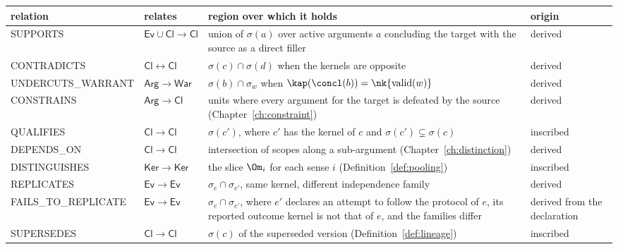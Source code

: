 \begin{center}
\small
\begin{tabularx}{\textwidth}{@{}l l X l@{}}
\toprule
relation & relates & region over which it holds & origin\\
\midrule
\textsf{SUPPORTS} & $\mathsf{Ev}\cup\mathsf{Cl}\to\mathsf{Cl}$ & union of $\sigma(a)$ over active arguments $a$ concluding the target with the source as a direct filler & derived\\
\textsf{CONTRADICTS} & $\mathsf{Cl}\leftrightarrow\mathsf{Cl}$ & $\sigma(c)\cap\sigma(d)$ when the kernels are opposite & derived\\
\textsf{UNDERCUTS\_WARRANT} & $\mathsf{Arg}\to\mathsf{War}$ & $\sigma(b)\cap\sigma_w$ when $\kap(\concl(b))=\nk{\mathrm{valid}(w)}$ & derived\\
\textsf{CONSTRAINS} & $\mathsf{Arg}\to\mathsf{Cl}$ & units where every argument for the target is defeated by the source (Chapter~\ref{ch:constraint}) & derived\\
\textsf{QUALIFIES} & $\mathsf{Cl}\to\mathsf{Cl}$ & $\sigma(c')$, where $c'$ has the kernel of $c$ and $\sigma(c')\subsetneq\sigma(c)$ & inscribed\\
\textsf{DEPENDS\_ON} & $\mathsf{Cl}\to\mathsf{Cl}$ & intersection of scopes along a sub-argument (Chapter~\ref{ch:distinction}) & derived\\
\textsf{DISTINGUISHES} & $\mathsf{Ker}\to\mathsf{Ker}$ & the slice $\Om_i$ for each sense $i$ (Definition~\ref{def:pooling}) & inscribed\\
\textsf{REPLICATES} & $\mathsf{Ev}\to\mathsf{Ev}$ & $\sigma_e\cap\sigma_{e'}$, same kernel, different independence family & derived\\
\textsf{FAILS\_TO\_REPLICATE} & $\mathsf{Ev}\to\mathsf{Ev}$ & $\sigma_e\cap\sigma_{e'}$, where $e'$ declares an attempt to follow the protocol of $e$, its reported outcome kernel is not that of $e$, and the families differ & derived from the declaration\\
\textsf{SUPERSEDES} & $\mathsf{Cl}\to\mathsf{Cl}$ & $\sigma(c)$ of the superseded version (Definition~\ref{def:lineage}) & inscribed\\
\bottomrule
\end{tabularx}
\end{center}


